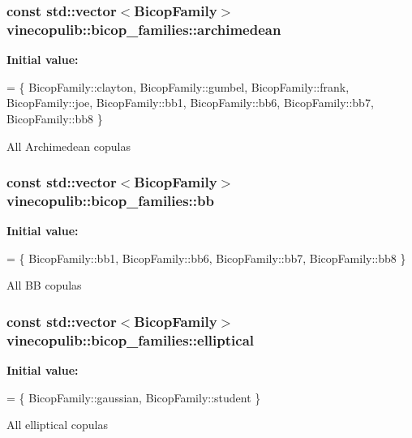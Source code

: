 \subsubsection[{\texorpdfstring{archimedean}{archimedean}}]{\setlength{\rightskip}{0pt plus 5cm}const std\+::vector$<${\bf Bicop\+Family}$>$ vinecopulib\+::bicop\+\_\+families\+::archimedean}\hypertarget{namespacevinecopulib_1_1bicop__families_a714863b69ae59ac48c7fb2be45cd2619}{}\label{namespacevinecopulib_1_1bicop__families_a714863b69ae59ac48c7fb2be45cd2619}
{\bfseries Initial value\+:}
\begin{DoxyCode}
= \{
    BicopFamily::clayton,
    BicopFamily::gumbel,
    BicopFamily::frank,
    BicopFamily::joe,
    BicopFamily::bb1,
    BicopFamily::bb6,
    BicopFamily::bb7,
    BicopFamily::bb8
\}
\end{DoxyCode}
All Archimedean copulas 
\subsubsection[{\texorpdfstring{bb}{bb}}]{\setlength{\rightskip}{0pt plus 5cm}const std\+::vector$<${\bf Bicop\+Family}$>$ vinecopulib\+::bicop\+\_\+families\+::bb}\hypertarget{namespacevinecopulib_1_1bicop__families_a1cb66138467920882f9c37611553aa34}{}\label{namespacevinecopulib_1_1bicop__families_a1cb66138467920882f9c37611553aa34}
{\bfseries Initial value\+:}
\begin{DoxyCode}
= \{
    BicopFamily::bb1,
    BicopFamily::bb6,
    BicopFamily::bb7,
    BicopFamily::bb8
\}
\end{DoxyCode}
All BB copulas 
\subsubsection[{\texorpdfstring{elliptical}{elliptical}}]{\setlength{\rightskip}{0pt plus 5cm}const std\+::vector$<${\bf Bicop\+Family}$>$ vinecopulib\+::bicop\+\_\+families\+::elliptical}\hypertarget{namespacevinecopulib_1_1bicop__families_a24b790671c9f4b25e57ecbc3505232fb}{}\label{namespacevinecopulib_1_1bicop__families_a24b790671c9f4b25e57ecbc3505232fb}
{\bfseries Initial value\+:}
\begin{DoxyCode}
= \{
    BicopFamily::gaussian,
    BicopFamily::student
\}
\end{DoxyCode}
All elliptical copulas 
